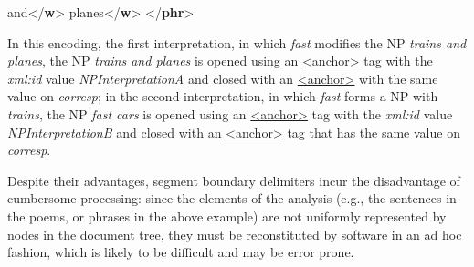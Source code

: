 \begin{shaded}
\mbox{}\newline 
{}and{</\textbf{w}>}\mbox{}\newline 
{}planes{</\textbf{w}>}\mbox{}\newline 
{}\mbox{}\newline 
{</\textbf{phr}>}\end{shaded}\egroup\par \par
In this encoding, the first interpretation, in which \textit{fast} modifies the NP \textit{trains and planes}, the NP \textit{trains and planes} is opened using an \hyperref[TEI.anchor]{<anchor>} tag with the {\itshape xml:id} value \textit{NPInterpretationA} and closed with an \hyperref[TEI.anchor]{<anchor>} with the same value on {\itshape corresp}; in the second interpretation, in which \textit{fast} forms a NP with \textit{trains}, the NP \textit{fast cars} is opened using an \hyperref[TEI.anchor]{<anchor>} tag with the {\itshape xml:id} value \textit{NPInterpretationB} and closed with an \hyperref[TEI.anchor]{<anchor>} tag that has the same value on {\itshape corresp}.\par
Despite their advantages, segment boundary delimiters incur the disadvantage of cumbersome processing: since the elements of the analysis (e.g., the sentences in the poems, or phrases in the above example) are not uniformly represented by nodes in the document tree, they must be reconstituted by software in an ad hoc fashion, which is likely to be difficult and may be error prone.\par
